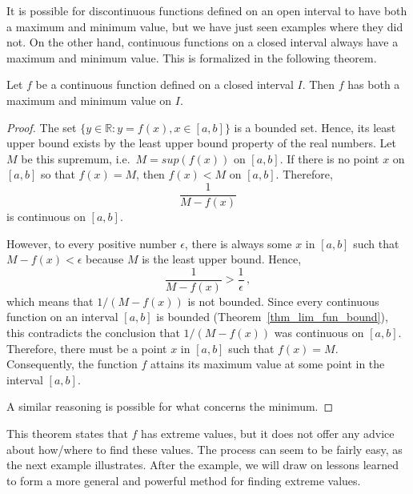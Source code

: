 \pagebreak 
It is possible for discontinuous functions defined on an open interval to have both a maximum and minimum value, but we have just seen examples where they did not. On the other hand, continuous functions on a closed interval always have a maximum and minimum value. This is formalized in the following theorem. 

\begin{theorem}\label{thm:extreme_val}%
Let $f$ be a continuous function defined on a closed interval $I$. Then $f$ has both a maximum and minimum value on $I$.
\end{theorem}

\ifanalysis


\begin{proof}
The set $\{y\in\mathbb{R} : y = f(x), x \in [a,b]\}$ is a bounded set. Hence, its least upper bound exists by the least upper bound property of the real numbers. Let $M$ be this supremum, i.e.\ $M = sup(f(x))$ on $[a, b]$. If there is no point $x$ on $[a, b]$ so that $f(x) = M$, then $f(x) < M$ on $[a, b]$. Therefore, 
$$
\dfrac{1}{M-f(x)}
$$
 is continuous on $[a, b]$.

However, to every positive number $\epsilon$, there is always some $x$ in $[a, b]$ such that $M - f(x) < \epsilon$ because $M$ is the least upper bound. Hence, 
$$
\dfrac{1}{M - f(x)} > \dfrac{1}{\epsilon}\,,$$
which means that $1/(M - f(x))$ is not bounded. Since every continuous function on an interval $[a, b]$ is bounded (Theorem~\ref{thm_lim_fun_bound}), this contradicts the conclusion that $1/(M - f(x))$ was continuous on $[a, b]$. Therefore, there must be a point $x$ in $[a, b]$ such that $f(x) = M$. Consequently, the function $f$ attains its maximum value at some point in the interval $[a, b]$.

A similar reasoning is possible for what concerns the minimum. 
\end{proof}

\fi

This theorem states that $f$ has extreme values, but it does not offer any advice about how/where to find these values. The process can seem to be fairly easy, as the next example illustrates. After the example, we will draw on lessons learned to form a more general and powerful method for finding extreme values.



